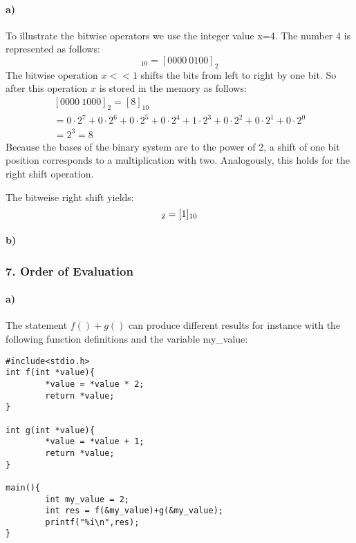 \documentclass[12pt]{article}
\begin{document}
\paragraph{a)}
To illustrate the bitwise operators we use the integer value x=4.
The number 4 is represented as follows:
\begin{equation}
[4]_{10} = [0000 \: 0100 ]_{2}
\end{equation}
The bitwise operation $x<<1$ shifts the bits from left to right by one bit. So after this operation $x$ is stored in the memory as follows:
\begin{equation}
\begin{split}
[0000 \: 1000 ]_{2} = [8]_{10} \\ 
= 0 \cdot 2^7 + 0 \cdot 2^6 + 0 \cdot 2^5 + 0 \cdot 2^4 + 1 \cdot 2^3 + 0 \cdot 2^2 + 0 \cdot 2^1 + 0 \cdot 2^0 \\
= 2^3 = 8
\end{split}
\end{equation}
Because the bases of the binary system are to the power of 2, a shift of one bit position corresponds to a multiplication with two. Analogously, this  holds for the right shift operation.

The bitweise right shift yields:
\begin{equation}
[0000 \: 0010 ]_{2} = [1]_{10} \\ 
\end{equation}
\paragraph{b)}


\subsubsection*{7. Order of Evaluation}
\paragraph{a)}
The statement $f() + g()$ can produce different results for instance with the following function definitions and the variable my\_value:

\begin{lstlisting}
#include<stdio.h>
int f(int *value){ 
        *value = *value * 2;
        return *value; 
}

int g(int *value){ 
        *value = *value + 1;
        return *value; 
}

main(){
        int my_value = 2;
        int res = f(&my_value)+g(&my_value);
        printf("%i\n",res);
}
\end{lstlisting}
\end{document}
